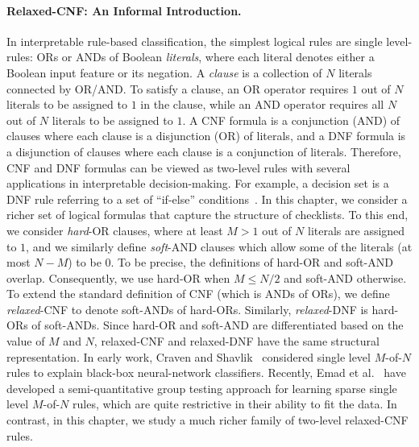 \paragraph{Relaxed-CNF: An Informal Introduction.} In interpretable rule-based classification, the simplest logical rules are single level-rules: ORs or ANDs of Boolean \textit{literals}, where each literal denotes either a Boolean input feature or its negation. A \emph{clause} is a collection of $ N $ literals connected by  OR/AND. To satisfy a clause, an OR operator requires $ 1 $ out of $ N $ literals to be assigned to  $ 1 $ in the clause, while an AND operator requires all $N$ out of $N$ literals to be assigned to  $ 1 $. A CNF   formula  is a conjunction (AND) of {clauses} where each clause is a disjunction (OR) of {literals}, and  a DNF  formula is a disjunction of clauses where each clause is a conjunction of literals. Therefore, CNF  and DNF  formulas can be viewed as two-level rules with several applications in interpretable decision-making. For example, a decision set is a DNF rule referring to a set of ``if-else'' conditions~\cite{ignatiev2018sat,lakkaraju2016interpretable}.  In this chapter, we consider a richer set of logical formulas that capture the structure of checklists. To this end, we consider \emph{hard}-OR clauses, where at least $ M > 1$ out of $ N $ literals are assigned to $ 1 $, and we similarly define {\emph{soft}-AND} clauses which allow some of the literals (at most $ N-M $) to be $ 0 $. To be precise,  the definitions of hard-OR and soft-AND overlap. Consequently, we use hard-OR when $M \le N/2$ and soft-AND otherwise. To extend the standard definition of CNF (which is ANDs of ORs),  we define \emph{relaxed}-CNF to denote soft-ANDs of hard-ORs. Similarly, \emph{relaxed}-DNF is hard-ORs of soft-ANDs. Since   hard-OR and soft-AND are differentiated based on the value of $ M $ and $ N $, relaxed-CNF and relaxed-DNF have the same structural representation. In early work, Craven and Shavlik~\cite{craven1996extracting} considered single level $ M $-of-$ N $ rules to explain black-box neural-network classifiers. Recently, Emad et al.~\cite{EVM2015} have developed a semi-quantitative group testing approach for learning sparse single level $M$-of-$N$ rules, which are quite restrictive in their ability to fit the data. In contrast, in this chapter, we study a much richer family of two-level relaxed-CNF rules. 





